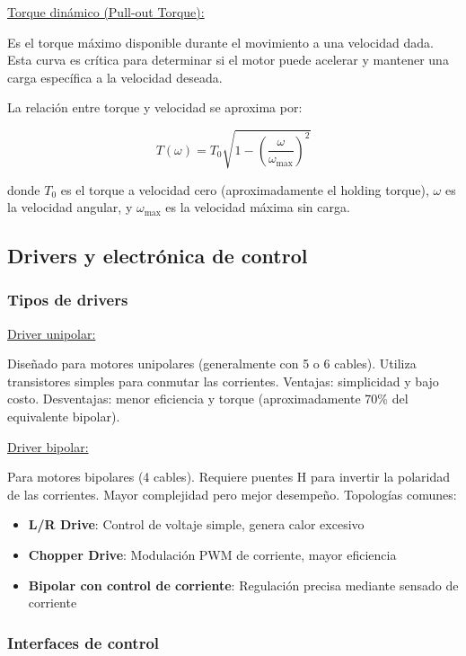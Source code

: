 \underline{Torque dinámico (Pull-out Torque):}

Es el torque máximo disponible durante el movimiento a una velocidad dada. Esta curva es crítica para determinar si el motor puede acelerar y mantener una carga específica a la velocidad deseada.

La relación entre torque y velocidad se aproxima por:

\begin{equation}
T(\omega) = T_0 \sqrt{1 - \left(\frac{\omega}{\omega_{\max}}\right)^2}
\end{equation}

donde $T_0$ es el torque a velocidad cero (aproximadamente el holding torque), $\omega$ es la velocidad angular, y $\omega_{\max}$ es la velocidad máxima sin carga.

\subsection{Drivers y electrónica de control}

\subsubsection{Tipos de drivers}

\underline{Driver unipolar:}

Diseñado para motores unipolares (generalmente con 5 o 6 cables). Utiliza transistores simples para conmutar las corrientes. Ventajas: simplicidad y bajo costo. Desventajas: menor eficiencia y torque (aproximadamente 70\% del equivalente bipolar).

\underline{Driver bipolar:}

Para motores bipolares (4 cables). Requiere puentes H para invertir la polaridad de las corrientes. Mayor complejidad pero mejor desempeño. Topologías comunes:

\begin{itemize}
    \item \textbf{L/R Drive}: Control de voltaje simple, genera calor excesivo
    \item \textbf{Chopper Drive}: Modulación PWM de corriente, mayor eficiencia
    \item \textbf{Bipolar con control de corriente}: Regulación precisa mediante sensado de corriente
\end{itemize}

\subsubsection{Interfaces de control}

